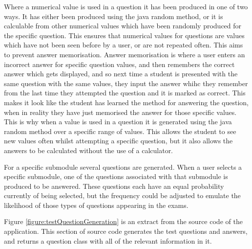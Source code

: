 \documentclass{article}
\begin{document}
Where a numerical value is used in a question it has been produced in one of two ways. It has either been produced using the java random method, or it is calculable from other numerical values which have been randomly produced for the specific question. This ensures that numerical values for questions are values which have not been seen before by a user, or are not repeated often. This aims to prevent answer memorisation. Answer memorisation is where a user enters an incorrect answer for specific question values, and then remembers the correct answer which gets displayed, and so next time a student is presented with the same question with the same values, they input the answer whihc they remember from the last time they attempted the question and it is marked as correct. This makes it look like the student has learned the method for answering the question, when in reality they have just memorised the answer for those specific values. This is why when a value is used in a question it is generated using the java random method over a specific range of values. This allows the student to see new values often whilst attempting a specific question, but it also allows the answers to be calculated without the use of a calculator. \par

For a specific submodule several questions are generated. When a user selects a specific submodule, one of the questions associated with that submodule is produced to be answered. These questions each have an equal probability currently of being selected, but the frequency could be adjusted to emulate the likelihood of those types of questions appearing in the exams. \par

Figure \ref{figure:testQuestionGeneration} is an extract from the source code of the application. This section of source code generates the test questions and answers, and returns a question class with all of the relevant information in it. 
\end{document}
